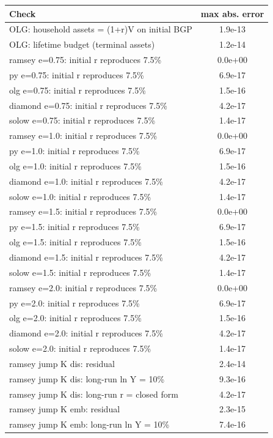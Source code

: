 \begin{tabular}{lc}\toprule Check & max abs. error\\\midrule
OLG: household assets = (1+r)V on initial BGP & 1.9e-13\\
OLG: lifetime budget (terminal assets) & 1.2e-14\\
ramsey e=0.75: initial r reproduces 7.5\% & 0.0e+00\\
py e=0.75: initial r reproduces 7.5\% & 6.9e-17\\
olg e=0.75: initial r reproduces 7.5\% & 1.5e-16\\
diamond e=0.75: initial r reproduces 7.5\% & 4.2e-17\\
solow e=0.75: initial r reproduces 7.5\% & 1.4e-17\\
ramsey e=1.0: initial r reproduces 7.5\% & 0.0e+00\\
py e=1.0: initial r reproduces 7.5\% & 6.9e-17\\
olg e=1.0: initial r reproduces 7.5\% & 1.5e-16\\
diamond e=1.0: initial r reproduces 7.5\% & 4.2e-17\\
solow e=1.0: initial r reproduces 7.5\% & 1.4e-17\\
ramsey e=1.5: initial r reproduces 7.5\% & 0.0e+00\\
py e=1.5: initial r reproduces 7.5\% & 6.9e-17\\
olg e=1.5: initial r reproduces 7.5\% & 1.5e-16\\
diamond e=1.5: initial r reproduces 7.5\% & 4.2e-17\\
solow e=1.5: initial r reproduces 7.5\% & 1.4e-17\\
ramsey e=2.0: initial r reproduces 7.5\% & 0.0e+00\\
py e=2.0: initial r reproduces 7.5\% & 6.9e-17\\
olg e=2.0: initial r reproduces 7.5\% & 1.5e-16\\
diamond e=2.0: initial r reproduces 7.5\% & 4.2e-17\\
solow e=2.0: initial r reproduces 7.5\% & 1.4e-17\\
ramsey jump K dis: residual & 2.4e-14\\
ramsey jump K dis: long-run ln Y = 10\% & 9.3e-16\\
ramsey jump K dis: long-run r = closed form & 4.2e-17\\
ramsey jump K emb: residual & 2.3e-15\\
ramsey jump K emb: long-run ln Y = 10\% & 7.4e-16\\

\end{tabular}
